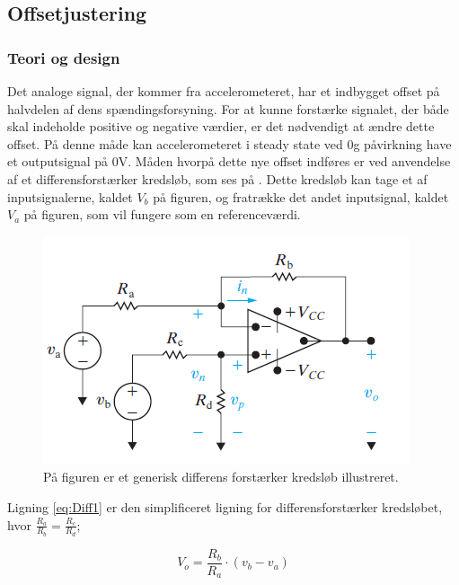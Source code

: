 \subsection{Offsetjustering}
\subsubsection{Teori og design}
Det analoge signal, der kommer fra accelerometeret, har et indbygget offset på halvdelen af dens spændingsforsyning. For at kunne forstærke signalet, der både skal indeholde positive og negative værdier, er det nødvendigt at ændre dette offset. På denne måde kan  accelerometeret i steady state ved $0$g påvirkning have et outputsignal på $0$V. Måden hvorpå dette nye offset indføres er ved anvendelse af et differensforstærker kredsløb, som ses på . Dette kredsløb kan tage et af inputsignalerne, kaldet $V_{b}$ på figuren, og  fratrække det andet inputsignal, kaldet $V_{a}$ på figuren, som vil fungere som en referenceværdi.

\begin{figure}[H]
\centering
\includegraphics[scale=1.3]{figures/cProblemloesning/Differensforstaerker_generisk.png}
\caption{På figuren er et generisk differens forstærker kredsløb illustreret. \cite{Nilsson2011}}
\label{fig:Differensforstaerker_generisk}
\end{figure}

\noindent Ligning \ref{eq:Diff1} er den simplificeret ligning for differensforstærker kredsløbet, hvor $\frac{R_a}{R_b} = \frac{R_c}{R_d}$;

\begin{equation}\label{eq:Diff1}
V_o = \frac{R_b}{R_a} \cdot (v_b - v_a)
\end{equation}


